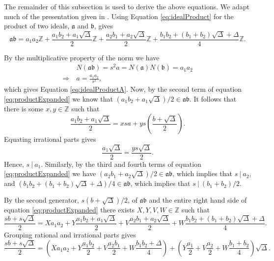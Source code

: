 \documentclass{ucalgthes1}
\theoremstyle{definition}
\newcommand{\ZZ}{\mathbb{Z}}
\newcommand{\ideal}{\mathfrak}
\begin{document}
The remainder of this subsection is used to derive the above equations.  We adapt much of the presentation given in \cite[pp.117--118]{Jacobson2009}. Using Equation \ref{eq:idealProduct} for the product of two ideals, $\ideal a$ and $\ideal b$, gives
\begin{equation}
\label{eq:productExpanded}
\mathfrak{a} \mathfrak{b} =
a_1 a_2 \ZZ + \frac{a_1b_2 + a_1\sqrt{\Delta}}{2} \ZZ + \frac{a_2b_1 + a_2\sqrt{\Delta}}{2} \ZZ + \frac{b_1b_2 + (b_1+b_2)\sqrt{\Delta} + \Delta}{4} \ZZ.
\end{equation}

\noindent
By the multiplicative property of the norm we have
\begin{align*}
	& N(\mathfrak{a}\mathfrak{b}) = s^2a = N(\mathfrak{a})N(\mathfrak{b}) = a_1 a_2 \\
	\Rightarrow~ & a = \frac{a_1a_2}{s^2},
\end{align*}
which gives Equation \ref{eq:idealProductA}. Now, by the second term of equation \eqref{eq:productExpanded} we know that $(a_1b_2 + a_1\sqrt{\Delta})/2 \in \mathfrak{a}\mathfrak{b}$.  It follows that there is some $x,y \in \ZZ$ such that
\[
	\frac{a_1b_2 + a_1\sqrt{\Delta}}{2} = xsa + ys\left(\frac{b+\sqrt{\Delta}}{2}\right).
\]
Equating irrational parts gives
\begin{equation*}
	\frac{a_1\sqrt{\Delta}}{2} = \frac{ys\sqrt{\Delta}}{2}.
\end{equation*}
\noindent
Hence, $s ~|~ a_1$.  Similarly, by the third and fourth terms of equation \eqref{eq:productExpanded} we have $(a_2b_1+a_2\sqrt{\Delta})/2 \in \mathfrak{a}\mathfrak{b}$, which implies that $s~|~a_2$, and $(b_1b_2 + (b_1+b_2)\sqrt{\Delta} + \Delta)/4 \in \mathfrak{a}\mathfrak{b}$, which implies that $s~|~(b_1+b_2)/2$. 

By the second generator, $s(b+\sqrt\Delta)/2$, of $\mathfrak{a}\mathfrak{b}$ and the entire right hand side of equation \eqref{eq:productExpanded} there exists $X, Y, V, W \in \ZZ$ such that
\[
\frac{sb+s\sqrt\Delta}{2} = Xa_1a_2 + Y\frac{a_1b_2+a_1\sqrt\Delta}{2} + V\frac{a_2b_1 + a_2\sqrt{\Delta}}{2} + W\frac{b_1b_2 + (b_1+b_2)\sqrt{\Delta} + \Delta}{4}.
\]
Grouping rational and irrational parts gives
\begin{equation}
\label{eq:productSecond}
\frac{sb+s\sqrt\Delta}{2} = \left( Xa_1a_2 + Y\frac{a_1b_2}{2} + V\frac{a_2b_1}{2} + W\frac{b_1b_2 + \Delta}{4} \right) + \left(Y\frac{a_1}{2} + V\frac{a_2}{2} + W\frac{b_1+b_2}{4}\right)\sqrt\Delta. 
\end{equation}
\end{document}
